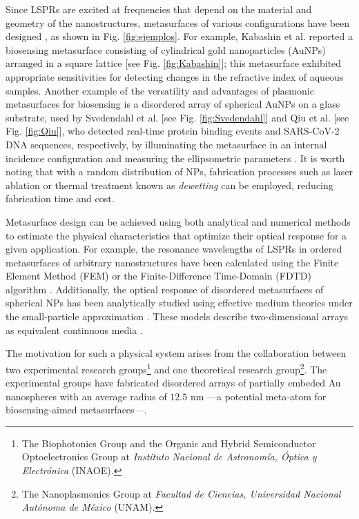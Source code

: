 Since LSPRs are excited at frequencies that depend on the material and geometry of the nanostructures, metasurfaces of various configurations have been designed \cite{feuz_improving_2010,kabashin_plasmonic_2009,qiu_dual_2020,svedendahl_refractometric_2014,chen_review_2016,estevez_trends_2014}, as shown in Fig. \ref{fig:ejemplos}. For example, Kabashin et al. \cite{kabashin_plasmonic_2009} reported a biosensing metasurface consisting of cylindrical gold nanoparticles (AuNPs) arranged in a square lattice [see Fig. \ref{fig:Kabashin}]; this metasurface exhibited appropriate sensitivities for detecting changes in the refractive index of aqueous samples. Another example of the versatility and advantages of plasmonic metasurfaces for biosensing is a disordered array of spherical AuNPs on a glass substrate, used by Svedendahl et al. \cite{svedendahl_refractometric_2014} [see Fig. \ref{fig:Svedendahl}] and Qiu et al. \cite{qiu_dual_2020} [see Fig. \ref{fig:Qiu}], who detected real-time protein binding events and SARS-CoV-2 DNA sequences, respectively, by illuminating the metasurface in an internal incidence configuration and measuring the ellipsometric parameters \cite{svedendahl_refractometric_2014,qiu_dual_2020}. It is worth noting that with a random distribution of NPs, fabrication processes such as laser ablation \cite{hammad_improving_2023} or thermal treatment known as \textit{dewetting} \cite{wang_formation_2011,cuanalo_sensitivity_2022} can be employed, reducing fabrication time and cost.

Metasurface design can be achieved using both analytical and numerical methods to estimate the physical characteristics that optimize their optical response for a given application. For example, the resonance wavelengths of LSPRs in ordered metasurfaces of arbitrary nanostructures have been calculated using the Finite Element Method (FEM) \cite{feuz_improving_2010} or the Finite-Difference Time-Domain (FDTD) algorithm \cite{qiu_differential_2015}. Additionally, the optical response of disordered metasurfaces of spherical NPs has been analytically studied using effective medium theories under the small-particle approximation \cite{reyes2022enhancement}. These models describe two-dimensional arrays as equivalent continuous media \cite{bosi_transmission_1992}.


 The motivation for such a physical system arises from the collaboration between two experimental research groups\footnote{The Biophotonics Group and the Organic and Hybrid Semiconductor Optoelectronics Group at \textit{Instituto Nacional de Astronomía, Óptica y Electrónica} (INAOE).} and one theoretical research group\footnote{The Nanoplasmonics Group at \textit{Facultad de Ciencias, Universidad Nacional Autónoma de México} (UNAM).}. The experimental groups have fabricated disordered arrays of partially embeded Au nanospheres with an average radius of $12.5$ nm ---a potential meta-atom for biosensing-aimed metasurfaces---. 

